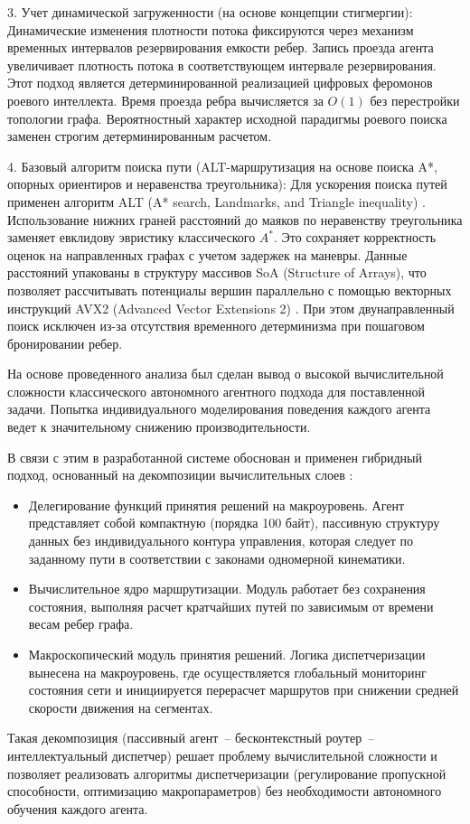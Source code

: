 3. Учет динамической загруженности (на основе концепции стигмергии):
Динамические изменения плотности потока фиксируются через механизм временных интервалов резервирования емкости ребер. Запись проезда агента увеличивает плотность потока в соответствующем интервале резервирования. Этот подход является детерминированной реализацией цифровых феромонов роевого интеллекта. Время проезда ребра вычисляется за $O(1)$ без перестройки топологии графа. Вероятностный характер исходной парадигмы роевого поиска заменен строгим детерминированным расчетом.

4. Базовый алгоритм поиска пути (ALT-маршрутизация на основе поиска A*, опорных ориентиров и неравенства треугольника):
Для ускорения поиска путей применен алгоритм ALT (A* search, Landmarks, and Triangle inequality) \cite{goldberg2004alt}. Использование нижних граней расстояний до маяков по неравенству треугольника заменяет евклидову эвристику классического $A^*$. Это сохраняет корректность оценок на направленных графах с учетом задержек на маневры. Данные расстояний упакованы в структуру массивов SoA (Structure of Arrays), что позволяет рассчитывать потенциалы вершин параллельно с помощью векторных инструкций AVX2 (Advanced Vector Extensions 2) \cite{butorin2026thread}. При этом двунаправленный поиск исключен из-за отсутствия временного детерминизма при пошаговом бронировании ребер.


На основе проведенного анализа был сделан вывод о высокой вычислительной сложности классического автономного агентного подхода для поставленной задачи. Попытка индивидуального моделирования поведения каждого агента ведет к значительному снижению производительности.

В связи с этим в разработанной системе обоснован и применен гибридный подход, основанный на декомпозиции вычислительных слоев \cite{butorin2026thread}:
\begin{itemize}
    \item Делегирование функций принятия решений на макроуровень. Агент представляет собой компактную (порядка 100 байт), пассивную структуру данных без индивидуального контура управления, которая следует по заданному пути в соответствии с законами одномерной кинематики.
    \item Вычислительное ядро маршрутизации. Модуль работает без сохранения состояния, выполняя расчет кратчайших путей по зависимым от времени весам ребер графа.
    \item Макроскопический модуль принятия решений. Логика диспетчеризации вынесена на макроуровень, где осуществляется глобальный мониторинг состояния сети и инициируется перерасчет маршрутов при снижении средней скорости движения на сегментах.
\end{itemize}

Такая декомпозиция (пассивный агент~-- бесконтекстный роутер~-- интеллектуальный диспетчер) решает проблему вычислительной сложности и позволяет реализовать алгоритмы диспетчеризации (регулирование пропускной способности, оптимизацию макропараметров) без необходимости автономного обучения каждого агента.

